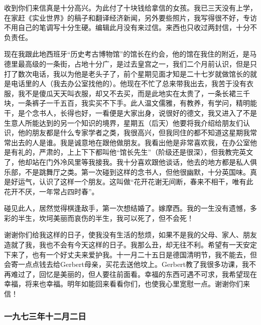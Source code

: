 \par {}
\par 收到你们来信真是十分高兴。为此付了十块钱给拿信的女孩。我已三天没有上学，在家赶《实业世界》的稿子和翻译经济新闻，另外要些照片，我写得很不好，专访不用自己的笔调写十分生硬。编辑此月没有来过信。来西也只收过两封信，十分不负责任。
\par 现在我跟此地西班牙“历史考古博物馆”的馆长在约会，他的馆在我住的附近，是马德里最高级的一条街，占地十分广，是过去皇宫之一，我们二个月前认识，但是只打了数次电话，我以为他是老头子了，前个星期见面才知是二十七岁就做馆长的就是电话里的人（我去办公室找他的）。他现在不忙了总来带我出去，我苦于没有衣服，我不是傻瓜天天叫衣服，却又不去买，而是此地实在太贵了，一条长裙三千块，一条裤子一千五百，我实买不下手。此人温文儒雅，有教养，有学问，精明能干，是个念书人，长得也好，一看便是大家出身，说很好的德文，我又进入了不是生意人所能达到的另一个知识的境界，星期五（后天）他要将我介绍给朋友们认识，他的朋友都是什么专家学者之类，我很高兴，但我同住的都不知道这星期我常常出去的人是谁。我是诚意地在跟他做朋友。我看出他是非常喜欢我，在办公室他是有礼的，严肃的，上上下下都叫他“馆长先生”（阶级还是很深），但我教完英文了，他却站在门外冷风里等我接我。我十分喜欢跟他谈话，他去的地方都是私人俱乐部，不是跳舞厅之类。第一次碰到这样的念书人，但他很幽默，十分英国味。真是好运气，认识了这样一个朋友。这叫做“花开花谢无间断，春来不相干，唯有此花开不厌，一年常占四时春”。
\par 碰见此人，居然觉得棋逢敌手，第一次想结婚了。嫁摩西。我的一生没有遗憾，多彩的半生，坎坷美丽而哀伤的半生，我可以死了，但不会死！
\par 谢谢你们给我这样的日子，使我没有生活的愁烦，如果不是我的父母、家人、朋友造就了我，我也不会有今天这样的日子。我那么丑，却无往不利。希望有一天安定下来了，也有一个好丈夫来爱护我。十一月二十五日是德国清明节，我不能去，但会寄一点点钱去给Gerbert母亲，买花去送他坟上。Gerbert教了我很多功课，我不再难过了，回忆是美丽的，但人要往前面看。幸福的东西可遇不可求，我希望现在幸福，将来也幸福。明年如能回来看看你们，也使我心里宽慰一点。谢谢你们来信！
\par {}

\subsubsection{一九七三年十二月二日}

